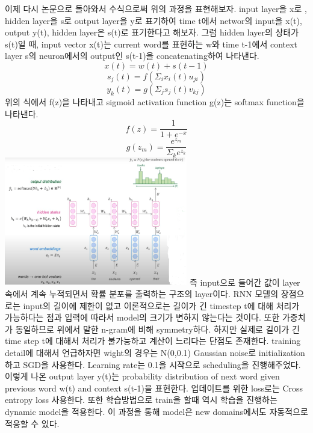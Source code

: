 \documentclass[extendedabs]{bmvc2k}
\begin{document}
 이제 다시 논문으로 돌아와서 수식으로써 위의 과정을 표현해보자. input layer을 x로 , hidden layer을 s로 output layer을 y로 표기하여
 time t에서 networ의 input을 x(t), output y(t), hidden layer은 s(t)로 표기한다고 해보자. 그럼  hidden layer의 상태가 s(t)일 때, input vector x(t)는 
 current word를 표현하는 w와 time t-1에서 context layer s의 neuron에서의 output인 s(t-1)을 concatenating하여 나타낸다.
 $$ x(t) = w(t) + s(t-1) $$
 $$ s_j(t) = f(\Sigma_i x_i(t)u_{ji})$$
 $$ y_k(t) = g(\Sigma_j s_j(t)v_{kj})$$
 위의 식에서 f(z)을 나타내고 sigmoid activation function g(z)는 softmax function을 나타낸다.
$$ f(z) = \frac{1}{1+e^{-x}}$$
$$ g(z_m) = \frac{e^{z_m}}{{\Sigma}_k e^{z_k}}$$
\newline  \includegraphics[width=8cm]{images/02_language.PNG}
\newline 즉 input으로 들어간 값이 layer 속에서 계속 누적되면서 확률 분포를 출력하는 구조의 layer이다.
RNN 모델의 장점으로는 input의 길이에 제한이 없고 이론적으로는 길이가 긴 timestep t에 대해 처리가 가능하다는 점과
입력에 따라서 model의 크기가 변하지 않는다는 것이다. 또한 가중치가 동일하므로 위에서 말한 n-gram에 비해 symmetry하다.
하지만 실제로 길이가 긴 time step t에 대해서 처리가 불가능하고 계산이 느리다는 단점도 존재한다.
\newline \quad training detail에 대해서 언급하자면 wight의 경우는 N(0,0.1)
Gaussian noise로 initialization 하고 SGD을 사용한다. Learning rate는 0.1을 시작으로 scheduling을 진행해주었다.
이렇게 나온 output layer y(t)는 probability distribution of next word given previous word w(t) and context s(t-1)을 표현한다.
업데이트를 위한 loss로는 Cross entropy loss 사용한다. 또한 학습방법으로 train을 할때 역시 학습을 진행하는 dynamic model을 적용한다.
이 과정을 통해 model은 new domains에서도 자동적으로 적응할 수 있다.
\end{document}
